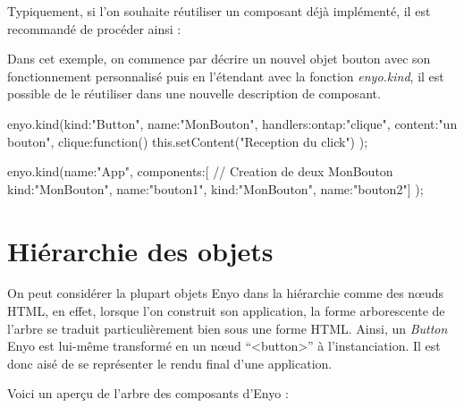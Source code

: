 \documentclass[11pt,a4paper]{report}
\begin{document}
Typiquement, si l'on souhaite réutiliser un composant déjà implémenté,
il est recommandé de procéder ainsi :

Dans cet exemple, on commence par décrire un nouvel objet bouton avec son fonctionnement
personnalisé puis en l'étendant avec la fonction \emph{enyo.kind}, il est possible de
le réutiliser dans une nouvelle description de composant.

\begin{JavaScript}
enyo.kind({kind:"Button", name:"MonBouton", 
           handlers:{ontap:"clique"}, 
           content:"un bouton",
           clique:function(){
             this.setContent("Reception du click")
           }
});

enyo.kind({name:"App", 
           components:[
             // Creation de deux MonBouton
             {kind:"MonBouton", name:"bouton1"},
             {kind:"MonBouton", name:"bouton2"}]
});
\end{JavaScript}

\section{Hiérarchie des objets}

On peut considérer la plupart objets Enyo dans la hiérarchie comme des n\oe{}uds HTML,
en effet, lorsque l'on construit son application, la forme arborescente de l'arbre se traduit
particulièrement bien sous une forme HTML. Ainsi, un \emph{Button} Enyo est lui-même transformé
en un n\oe{}ud ``<button>'' à l'instanciation. Il est donc aisé de se représenter le rendu final 
d'une application.

Voici un aperçu de l'arbre des composants d'Enyo :\medskip

\end{document}
